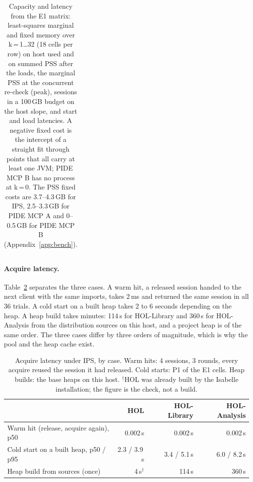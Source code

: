 \documentclass[11pt]{article}
\begin{document}
\begin{table}[!htb]
\begin{tabular}{@{}llrrrrrrr@{}}
\bottomrule
\end{tabular}
\caption{Capacity and latency from the E1 matrix: least-squares marginal
  and fixed memory over k\,=\,1\ldots32 (18 cells per row) on host used
  and on summed PSS after the loads, the marginal PSS at the concurrent
  re-check (peak), sessions in a 100\,GB budget on the host slope, and
  start and load latencies. A negative fixed cost is the intercept of a
  straight fit through points that all carry at least one JVM; PIDE MCP B
  has no process at k\,=\,0. The PSS fixed costs are 3.7--4.3\,GB for IPS,
  2.5--3.3\,GB for PIDE MCP A and 0--0.5\,GB for PIDE MCP B
  (Appendix~\ref{app:bench}).}
\label{tab:capacity}
\end{table}

\paragraph{Acquire latency.} Table~\ref{tab:acquire} separates the three
cases. A warm hit, a released session handed to the next client with the
same imports, takes 2\,ms and returned the same session in all 36 trials.
A cold start on a built heap takes 2 to 6 seconds depending on the heap.
A heap build takes minutes: 114\,s for HOL-Library and 360\,s for
HOL-Analysis from the distribution sources on this host, and a project
heap is of the same order. The three cases differ by three orders of
magnitude, which is why the pool and the heap cache exist.

\begin{table}[!htb]
\centering\small
\begin{tabular}{@{}lrrr@{}}
\toprule
 & HOL & HOL-Library & HOL-Analysis \\
\midrule
Warm hit (release, acquire again), p50 & 0.002\,s & 0.002\,s & 0.002\,s \\
Cold start on a built heap, p50 / p95 & 2.3 / 3.9\,s & 3.4 / 5.1\,s & 6.0 / 8.2\,s \\
Heap build from sources (once) & 4\,s$^{\dagger}$ & 114\,s & 360\,s \\
\bottomrule
\end{tabular}
\caption{Acquire latency under IPS, by case. Warm hits: 4 sessions, 3
  rounds, every acquire reused the session it had released. Cold starts:
  P1 of the E1 cells. Heap builds: the base heaps on this host.
  $^{\dagger}$HOL was already built by the Isabelle installation; the
  figure is the check, not a build.}
\label{tab:acquire}
\end{table}
\end{document}
